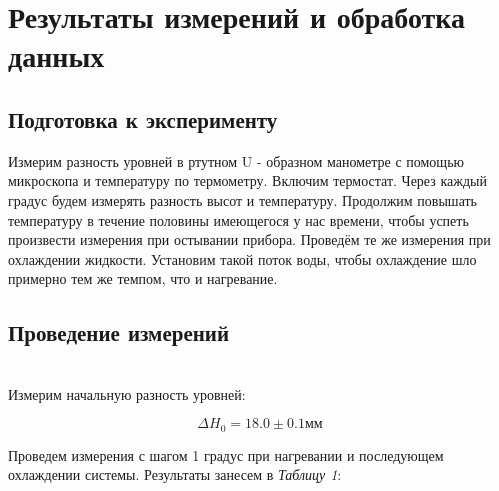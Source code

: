\section{Результаты измерений и обработка данных}

\subsection{Подготовка к эксперименту}
Измерим разность уровней в ртутном U - образном манометре с помощью микроскопа и температуру по термометру. Включим термостат. Через каждый градус будем измерять разность высот и температуру. Продолжим повышать температуру в течение половины имеющегося у нас времени, чтобы успеть произвести измерения при остывании прибора. Проведём те же измерения при охлаждении жидкости. Установим такой поток воды, чтобы охлаждение шло примерно тем же темпом, что и нагревание.
\\
\newpage
\subsection{Проведение измерений}\\

Измерим начальную разность уровней:

\begin{equation*}
	\Delta H _0 = 18.0 \pm 0.1 мм
\end{equation*}

Проведем измерения с шагом 1 градус при нагревании и последующем охлаждении системы. Результаты занесем в \textit{Таблицу 1}:

